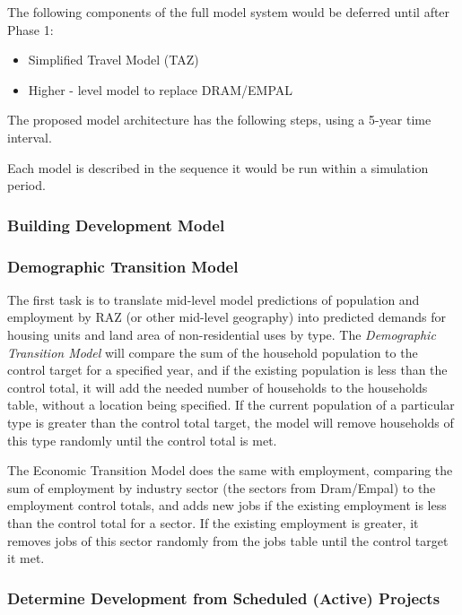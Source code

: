 The following components of the full model system would be deferred until after Phase 1:

\begin{itemize}
\item Simplified Travel Model (TAZ)
\item Higher - level model to replace DRAM/EMPAL
\end{itemize}

The proposed model architecture has the following steps, using a 5-year time interval.

Each model is described in the sequence it would be run within a simulation period.

\subsubsection{Building Development Model}

 

\subsubsection{Demographic Transition Model}

The first task is to translate mid-level model predictions of population and employment by RAZ (or
other mid-level geography) into predicted demands for housing units and land area of non-residential
uses by type. The \emph{Demographic Transition Model} will compare the sum of the household
population to the control target for a specified year, and if the existing population is less than the control
total, it will add the needed number of households to the households table, without a location being specified.
If the current population of a particular type is greater than the control total target, the model will remove
households of this type randomly until the control total is met.


The Economic Transition Model does the same with employment, comparing the sum of employment by
industry sector (the sectors from Dram/Empal) to the employment control totals, and adds new jobs if the
existing employment is less than the control total for a sector.  If the existing employment is greater, it
removes jobs of this sector randomly from the jobs table until the control target it met.

\subsubsection{Determine Development from Scheduled (Active) Projects}

